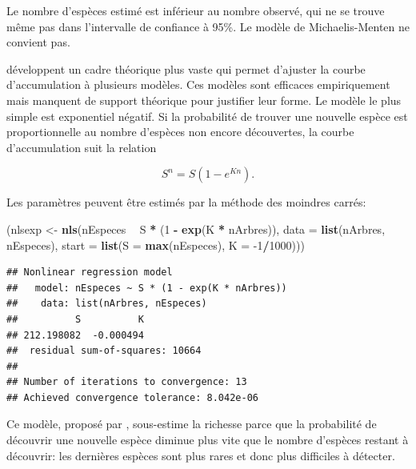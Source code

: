 \documentclass[
  11pt,
  french,
  a4paper,
  extrafontsizes,onecolumn,openright
  ]{memoir}
\newenvironment{Shaded}{\begin{snugshade}}{\end{snugshade}}
\newcommand{\DataTypeTok}[1]{\textcolor[rgb]{0.13,0.29,0.53}{#1}}
\newcommand{\DecValTok}[1]{\textcolor[rgb]{0.00,0.00,0.81}{#1}}
\newcommand{\KeywordTok}[1]{\textcolor[rgb]{0.13,0.29,0.53}{\textbf{#1}}}
\newcommand{\NormalTok}[1]{#1}
\newcommand{\OperatorTok}[1]{\textcolor[rgb]{0.81,0.36,0.00}{\textbf{#1}}}
\newcommand{\StringTok}[1]{\textcolor[rgb]{0.31,0.60,0.02}{#1}}
\begin{document}
\normalsize

Le nombre d'espèces estimé est inférieur au nombre observé, qui ne se trouve même pas dans l'intervalle de confiance à 95\%.
Le modèle de Michaelis-Menten ne convient pas.

\textcite{Soberon1993} développent un cadre théorique plus vaste qui permet d'ajuster la courbe d'accumulation à plusieurs modèles.
Ces modèles sont efficaces empiriquement mais manquent de support théorique pour justifier leur forme.
Le modèle le plus simple est exponentiel négatif.
Si la probabilité de trouver une nouvelle espèce est proportionnelle au nombre d'espèces non encore découvertes, la courbe d'accumulation suit la relation

\begin{equation} 
  \label{eq:Soberon1993a}
  S^{n} = S \left( 1 - e^{Kn} \right).
\end{equation}

Les paramètres peuvent être estimés par la méthode des moindres carrés:

\scriptsize

\begin{Shaded}
\begin{Highlighting}[]
\NormalTok{(nlsexp <-}\StringTok{ }\KeywordTok{nls}\NormalTok{(nEspeces }\OperatorTok{~}\StringTok{ }\NormalTok{S }\OperatorTok{*}\StringTok{ }\NormalTok{(}\DecValTok{1} \OperatorTok{-}\StringTok{ }\KeywordTok{exp}\NormalTok{(K }\OperatorTok{*}\StringTok{ }\NormalTok{nArbres)), }\DataTypeTok{data =} \KeywordTok{list}\NormalTok{(nArbres,}
\NormalTok{    nEspeces), }\DataTypeTok{start =} \KeywordTok{list}\NormalTok{(}\DataTypeTok{S =} \KeywordTok{max}\NormalTok{(nEspeces), }\DataTypeTok{K =} \DecValTok{-1}\OperatorTok{/}\DecValTok{1000}\NormalTok{)))}
\end{Highlighting}
\end{Shaded}

\begin{verbatim}
## Nonlinear regression model
##   model: nEspeces ~ S * (1 - exp(K * nArbres))
##    data: list(nArbres, nEspeces)
##          S          K 
## 212.198082  -0.000494 
##  residual sum-of-squares: 10664
## 
## Number of iterations to convergence: 13 
## Achieved convergence tolerance: 8.042e-06
\end{verbatim}

\normalsize

Ce modèle, proposé par \textcite{Holdridge1971}, sous-estime la richesse parce que la probabilité de découvrir une nouvelle espèce diminue plus vite que le nombre d'espèces restant à découvrir: les dernières espèces sont plus rares et donc plus difficiles à détecter.
\end{document}
